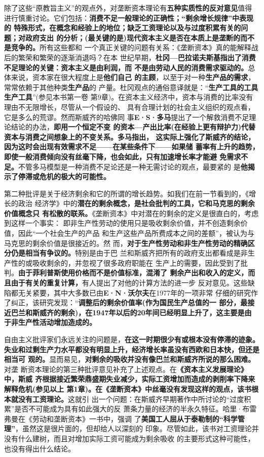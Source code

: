 除了这些“原教旨主义”的观点外，对垄断资本理论有\textbf{五种实质性的反对意见}值得
进行慎重讨论。它们包括：\textbf{消费不足一般理论的正确性；“剩余增长规律”中表现的
  特殊形式，在概念和经验上的地位；缺乏工资理论以及与过度积累有关的问题；对政府支出
  的分析；(最关键的是)现代资本主义是否在本质上是垄断的而不是竞争的。}所有这些都和
一个真正关键的问题有关系：《垄断资本》真的能解释战后的繁荣和繁荣的逐渐消退吗？在本
世纪早期，\textbf{杜冈—巴拉诺夫斯基指出了消费不足理论的关键：资本主义是由利润，而
  不是由劳动人民的消费需求驱动的。}总体来说，资本家在很大程度上是\textbf{他们自己
  的主顾}，以至于对一种\textbf{生产品的需求}，常常依赖于其他种类\textbf{生产品}的
产量。杜冈观点的通俗意译就是：“\textbf{生产工具的工具生产工具}”(参见本书第一卷
第9章)。在资本主义经济中，资本与消费的比率没有理由不无限增长，尽管从一个假设的、
具有合理计划的社会主义组织的观点看，它是多么的荒谬。然而斯威齐的哈佛同
事\textbf{E·S·多马}提出了一个解救消费不足理论结论的办法，\textbf{即用一个恒定不变
  的资本—产出比率(在经验上更有辩护力)代替资本与消费之间想象上的不变关系。多马指出，
  这实际上强化了斯威齐的结论，因为这时会出现有效需求不足——在某些条件下——如果储
  蓄率有上升的趋势，即使一般消费倾向没有丝毫下降，也会如此，只有加速增长率才能避
  免需求不足。}不管多马模型是一种消费不足论还是一种无需讨论的观点，最要紧的
是\textbf{他揭示了停滞或危机的极大的可能性。}

第二种批评是关于经济剩余和它的所谓的增长趋势。如我们在前一节看到的，《增长的政治
经济学》中的\textbf{潜在的剩余概念，是社会批判的工具，它和马克思的剩余价值概念只
  有松散的联系。}《垄断资本》中对潜在的剩余的定义是很直白的，考虑到这样一个事实：
即非生产性劳动的使用只是吸收剩余价值，并不创造剩余价值，因此“一个社会生产的产品
和生产这些产品所费成本之间的差额”，被认为与马克思的剩余价值是很接近的。然
而，\textbf{对于生产性劳动和非生产性劳动的精确区分仍是相当有争议的。}特别是由于巴
兰和斯威齐把所有的政府支出都看成是非生产性的或吸收剩余的，并忽视了很多政府职能在
生产上的需要，因此受到了批判。\textbf{由于菲利普斯使用价格而不是价值标准，混淆了
  剩余产出和收入的定义，而且由于有关的重复计算，}有人提出了对他的计算方法的进一步
反对意见。这些缺陷都无关紧要，其中大多数已由\textbf{E·N·沃尔夫}在1977年的一项非常
仔细的研究作了纠正，该研究发现：“\textbf{调整后的剩余价值率(作为国民生产总值的一
  部分，最接近巴兰和斯威齐的剩余)，在1947年以后的20年间已经明显上升了，这主要是由
  于非生产性活动增加造成的。}

自由主义批评家们永远关注的问题是，\textbf{在这一时期很少有或根本没有停滞的迹象。
  失业和过剩生产力水平都没有明显上升，经济增长率虽没有西欧和日本快，但还是相当可
  观的。}显而易见，\textbf{对剩余的吸收并没有像巴兰和斯威齐所说的那么困难。}对垄
断资本理论的第三种批评意见补充了上述观点。在\textbf{《资本主义发展理论》中，斯威
  齐根据接近繁荣鼎盛期失业减少，实际工资增加而造成的剥削率下降来解释危机(参见以上
  第1章)。在《垄断资本》中丝毫没有发现这样的观点，该书根本就没有工资理论。}这就引
出一个问题：在斯威齐早期著作中所讨论的“过度积累”是否不可能成为具有如此强大的反
萧条力量的经济的半永久特征。哈里·布雷弗曼在《劳动和垄断资本》一书中，强调
了\textbf{美国工人屈从于泰勒制的“科学管理”}，虽然这是很片面的，但却给人以深刻的
印象。尽管如此，该书对工资理论并没有什么建树，而且对增加实际工资可能成为剩余吸收
的主要形式这种可能性，也没有得出什么结论。

